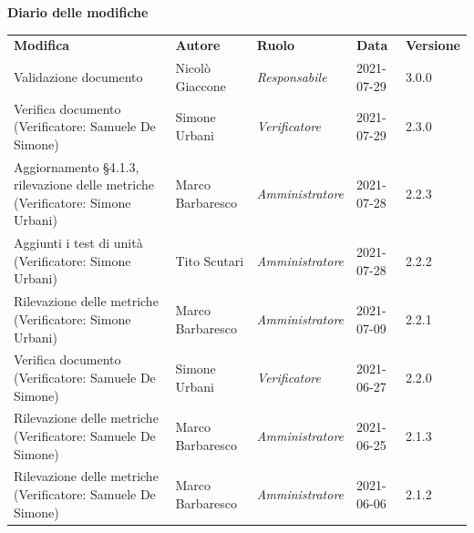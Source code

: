 \documentclass[a4paper]{article}
\begin{document}
\begin{center}
    \centering
    \textbf{\Large Diario delle modifiche}\\
    \vspace{10px}
    \renewcommand{\arraystretch}{1.8}
    \label{tab:Diario delle modifiche}
    \begin{longtable}[!h]{p{160px} p{80px} p{70px} p{55px} p{40px}}
        \rowcolor{logo!70} \textbf{Modifica}                                                      & \textbf{Autore}   & \textbf{Ruolo}          & \textbf{Data} & \textbf{Versione} \\
        Validazione documento                                                                     & Nicolò Giaccone   & \textit{Responsabile}   & 2021-07-29    & 3.0.0             \\
        Verifica documento \newline (Verificatore: Samuele De Simone)                             & Simone Urbani     & \textit{Verificatore}   & 2021-07-29    & 2.3.0             \\
        Aggiornamento \S 4.1.3, rilevazione delle metriche \newline (Verificatore: Simone Urbani) & Marco Barbaresco  & \textit{Amministratore} & 2021-07-28    & 2.2.3             \\
        Aggiunti i test di unità \newline (Verificatore: Simone Urbani)                           & Tito Scutari      & \textit{Amministratore} & 2021-07-28    & 2.2.2             \\
        Rilevazione delle metriche \newline (Verificatore: Simone Urbani)                         & Marco Barbaresco  & \textit{Amministratore} & 2021-07-09    & 2.2.1             \\
        Verifica documento \newline (Verificatore: Samuele De Simone)                             & Simone Urbani     & \textit{Verificatore}   & 2021-06-27    & 2.2.0             \\
        Rilevazione delle metriche \newline (Verificatore: Samuele De Simone)                     & Marco Barbaresco  & \textit{Amministratore} & 2021-06-25    & 2.1.3             \\
        Rilevazione delle metriche \newline (Verificatore: Samuele De Simone)                     & Marco Barbaresco  & \textit{Amministratore} & 2021-06-06    & 2.1.2             \\

\end{longtable}
\end{center}
\end{document}
